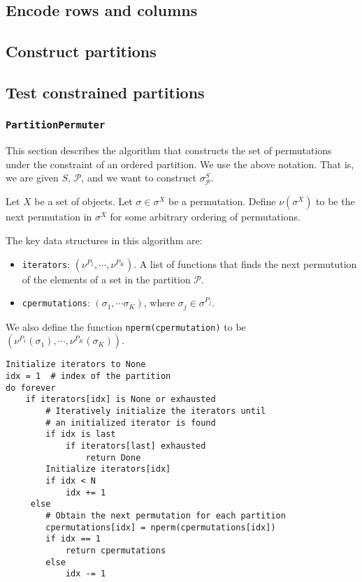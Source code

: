 \documentclass{article}
\begin{document}
\subsection{Encode rows and columns}
\subsection{Construct partitions}
\subsection{Test constrained partitions}
\subsubsection{{\tt PartitionPermuter}}
This section describes the algorithm that constructs the set of permutations under the constraint of an ordered partition. We use the above notation. That is, we are given $S$, $\mathcal{P}$, and we want to construct $\sigma^S_{\mathcal{P}}$.


Let $X$ be a set of objects. Let $\sigma \in \sigma^X$ be a permutation. Define $\nu(\sigma^X)$
to be the next permutation in $\sigma^X$ for some arbitrary ordering of permutations.

The key data structures in this algorithm are:
\begin{itemize}
    \item {\tt iterators}: 
    $( \nu^{P_1}, \cdots, \nu^{P_K} )$. A list of functions that finds the next permutution of the elements of a set in the partition $\mathcal{P}$.
    \item {\tt cpermutations}: $(\sigma_1, \cdots \sigma_K)$, where $\sigma_j \in \sigma^{P_j}$.
\end{itemize}
We also define the function {\tt nperm(cpermutation)} to be $(\nu^{P_1} (\sigma_1), \cdots, \nu^{P_K} (\sigma_K))$.
\begin{lstlisting}
Initialize iterators to None
idx = 1  # index of the partition
do forever
    if iterators[idx] is None or exhausted
        # Iteratively initialize the iterators until
        # an initialized iterator is found
        if idx is last
            if iterators[last] exhausted
                return Done
        Initialize iterators[idx]
        if idx < N
            idx += 1
     else
        # Obtain the next permutation for each partition
        cpermutations[idx] = nperm(cpermutations[idx])
        if idx == 1
            return cpermutations
        else
            idx -= 1
\end{lstlisting}
\end{document}
